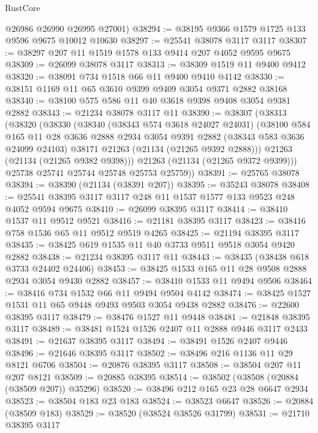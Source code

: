 \begin{lexlean}{RustCore}
\begin{coremodule}
      @26986
      @26990
      @26995
      @27001)
@38294 := @38195 @9366 @1579 @1725 @133 @9596 @9675 @10012 @10630
@38297 := @25541 @38078 @3117 @3117
@38307 := @38297 @207 @11 @1519 @1578 @133 @9414 @207 @4052 @9595 @9675
@38309 := @26099 @38078 @3117
@38313 := @38309 @1519 @11 @9400 @9412
@38320 := @38091 @734 @1518 @66 @11 @9400 @9410 @4142
@38330 := @38151 @1169 @11 @65 @3610 @9399 @9409 @3054 @9371 @2882 @38168
@38340 := @38100 @575 @586 @11 @40 @3618 @9398 @9408 @3054 @9381 @2882
@38343 := @21234 @38078 @3117 @11
@38390 := @38307
    (@38313
      (@38320
        (@38330
          (@38340
            (@38343 @574 @3618 @24027 @24031)
            (@38100
              @584
              @165
              @11
              @28
              @3636
              @2888
              @2934
              @3054
              @9391
              @2882
              (@38343 @583 @3636 @24099 @24103)
              @38171
              @21263
              (@21134 (@21265 @9392 @2888)))
            @21263
            (@21134 (@21265 @9382 @9398)))
          @21263
          (@21134 (@21265 @9372 @9399)))
        @25738
        @25741
        @25744
        @25748
        @25753
        @25759))
@38391 := @25765 @38078
@38394 := @38390 (@21134 (@38391 @207))
@38395 := @35243 @38078
@38408 := @25541 @38395 @3117 @3117 @248 @11 @1537 @1577 @133 @9523 @248 @4052 @9594 @9675
@38410 := @26099 @38395 @3117
@38414 := @38410 @1537 @11 @9512 @9521
@38416 := @21181 @38395 @3117
@38423 := @38416 @758 @1536 @65 @11 @9512 @9519 @4265
@38425 := @21194 @38395 @3117
@38435 := @38425 @619 @1535 @11 @40 @3733 @9511 @9518 @3054 @9420 @2882
@38438 := @21234 @38395 @3117 @11
@38443 := @38435 (@38438 @618 @3733 @24402 @24406)
@38453 := @38425 @1533 @165 @11 @28 @9508 @2888 @2934 @3054 @9430 @2882
@38457 := @38410 @1533 @11 @9494 @9506
@38464 := @38416 @734 @1532 @66 @11 @9494 @9504 @4142
@38474 := @38425 @1527 @1531 @11 @65 @9448 @9493 @9503 @3054 @9438 @2882
@38476 := @22600 @38395 @3117
@38479 := @38476 @1527 @11 @9448
@38481 := @21848 @38395 @3117
@38489 := @38481 @1524 @1526 @2407 @11 @2888 @9446 @3117 @2433
@38491 := @21637 @38395 @3117
@38494 := @38491 @1526 @2407 @9446
@38496 := @21646 @38395 @3117
@38502 := @38496 @216 @1136 @11 @29 @8121 @6706
@38504 := @20876 @38395 @3117
@38508 := @38504 @207 @11 @207 @8121
@38509 := @20885 @38395
@38514 := @38502 (@38508 (@20884 (@38509 @207)) @35296)
@38520 := @38496 @212 @165 @23 @28 @6647 @2934
@38523 := @38504 @183 @23 @183
@38524 := @38523 @6647
@38526 := @20884 (@38509 @183)
@38529 := @38520 (@38524 @38526 @31799)
@38531 := @21710 @38395 @3117

\end{coremodule}
\end{lexlean}
